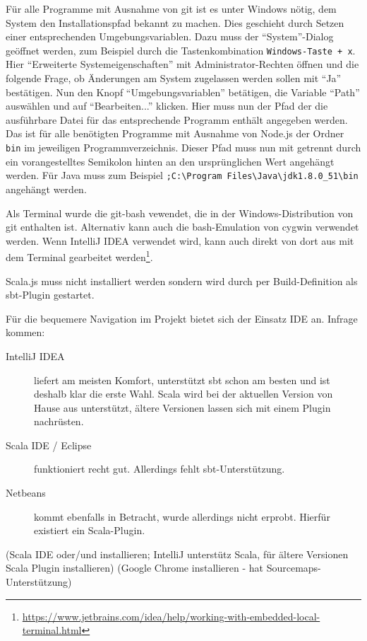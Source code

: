 \documentclass[a4paper, 12pt, listof=totoc, bibliography=totoc]{scrreprt}
\begin{document}
Für alle Programme mit Ausnahme von git ist es unter Windows nötig, dem System den Installationspfad bekannt zu machen. Dies geschieht durch Setzen einer entsprechenden Umgebungsvariablen. Dazu muss der "`System"'-Dialog geöffnet werden, zum Beispiel durch die Tastenkombination \texttt{Windows-Taste + x}. Hier "`Erweiterte Systemeigenschaften"' mit Administrator-Rechten öffnen und die folgende Frage, ob Änderungen am System zugelassen werden sollen mit "`Ja"' bestätigen. Nun den Knopf "`Umgebungsvariablen"' betätigen, die Variable "`Path"' auswählen und auf "`Bearbeiten..."' klicken. Hier muss nun der Pfad der die ausführbare Datei für das entsprechende Programm enthält angegeben werden. Das ist für alle benötigten Programme mit Ausnahme von Node.js der Ordner \texttt{bin} im jeweiligen Programmverzeichnis. Dieser Pfad muss nun mit getrennt durch ein vorangestelltes Semikolon hinten an den ursprünglichen Wert angehängt werden. Für Java muss zum Beispiel \texttt{;C:\textbackslash{}Program Files\textbackslash{}Java\textbackslash{}jdk1.8.0\_51\textbackslash{}bin} angehängt werden.

Als Terminal wurde die git-bash vewendet, die in der Windows-Distribution von git enthalten ist. Alternativ kann auch die bash-Emulation von cygwin verwendet werden. Wenn IntelliJ IDEA verwendet wird, kann auch direkt von dort aus mit dem Terminal gearbeitet werden\footnote{\url{https://www.jetbrains.com/idea/help/working-with-embedded-local-terminal.html}}.

Scala.js muss nicht installiert werden sondern wird durch per Build-Definition als sbt-Plugin gestartet.

Für die bequemere Navigation im Projekt bietet sich der Einsatz IDE an. Infrage kommen:

\begin{description}
	\item[IntelliJ IDEA] liefert am meisten Komfort, unterstützt sbt schon am besten und ist deshalb klar die erste Wahl. Scala wird bei der aktuellen Version von Hause aus unterstützt, ältere Versionen lassen sich mit einem Plugin nachrüsten.
	\item[Scala IDE / Eclipse] funktioniert recht gut. Allerdings fehlt sbt-Unterstützung.
	\item[Netbeans] kommt ebenfalls in Betracht, wurde allerdings nicht erprobt. Hierfür existiert ein Scala-Plugin.
\end{description}


(Scala IDE oder/und  installieren; IntelliJ unterstütz Scala, für ältere Versionen Scala Plugin installieren)
(Google Chrome installieren - hat Sourcemaps-Unterstützung)
\end{document}
